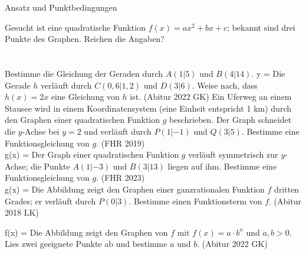 \setcounter{aufgabe}{8}

\begin{aufgabe}{Ansatz und Punktbedingungen}
\begin{teile}
\teil Gesucht ist eine quadratische Funktion $f(x) = ax^2 + bx + c$; bekannt sind drei Punkte des Graphen. Reichen die Angaben? \\  \\  \\ 
\teil Bestimme die Gleichung der Geraden durch $A(1|5)$ und $B(4|14)$. y = \leerfeld
\teil Die Gerade $h$ verläuft durch $C(0{,}6|1{,}2)$ und $D(3|6)$. Weise nach, dass $h(x) = 2x$ eine Gleichung von $h$ ist. \hfill (Abitur 2022 GK)
\teil Ein Uferweg an einem Stausee wird in einem Koordinatensystem (eine Einheit entspricht 1 km) durch den Graphen einer quadratischen Funktion $g$ beschrieben. Der Graph schneidet die $y$-Achse bei $y = 2$ und verläuft durch $P(1|-1)$ und $Q(3|5)$. Bestimme eine Funktionsgleichung von $g$. \hfill (FHR 2019) \\ g(x) = \leerfeld
\teil Der Graph einer quadratischen Funktion $g$ verläuft symmetrisch zur $y$-Achse; die Punkte $A(1|-3)$ und $B(3|13)$ liegen auf ihm. Bestimme eine Funktionsgleichung von $g$. \hfill (FHR 2023) \\ g(x) = \leerfeld
\teil Die Abbildung zeigt den Graphen einer ganzrationalen Funktion $f$ dritten Grades; er verläuft durch $P(0|3)$. Bestimme einen Funktionsterm von $f$. \hfill (Abitur 2018 LK) \\

\begin{ksys}[xmin=-3,xmax=4,ymin=-3,ymax=5,ablesen]   \end{ksys}
f(x) = \leerfeld
\teil Die Abbildung zeigt den Graphen von $f$ mit $f(x) = a \cdot b^x$ und $a, b > 0$. Lies zwei geeignete Punkte ab und bestimme $a$ und $b$. \hfill (Abitur 2022 GK) \\


\end{teile}
\end{aufgabe}
